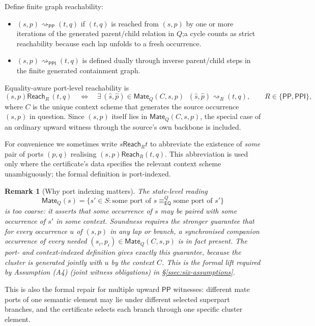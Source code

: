 \documentclass[11pt]{article}
\newtheorem{remark}[theorem]{Remark}
\newcommand{\EQ}{\mathsf{EQ}}
\newcommand{\PP}{\mathsf{PP}}
\newcommand{\PPI}{\mathsf{PPI}}
\newcommand{\Mate}{\mathsf{Mate}}
\newcommand{\reach}{\rightsquigarrow}
\newcommand{\Reach}{\mathrel{\mathsf{Reach}}}
\newcommand{\eqc}{\equiv_{\EQ}}
\begin{document}
Define finite graph reachability:
\begin{itemize}
\item $(s,p)\reach_{\PP}(t,q)$ if $(t,q)$ is reached from $(s,p)$ by
one or more iterations of the generated parent/child relation in
$Q$;\@ a cycle counts as strict reachability because each lap
unfolds to a fresh occurrence.
\item $(s,p)\reach_{\PPI}(t,q)$ is defined dually through inverse
parent/child steps in the finite generated containment graph.
\end{itemize}
Equality-aware port-level reachability is
\[
  (s,p)\Reach_R\,(t,q)
  \quad\Longleftrightarrow\quad
  \exists\,(\widehat s,\widehat p)\in\Mate_Q(C,s,p)\;\;
  (\widehat s,\widehat p)\reach_R(t,q),
  \qquad R\in\{\PP,\PPI\},
\]
where $C$ is the unique context scheme that generates the source
occurrence $(s,p)$ in question.  Since $(s,p)$ itself lies in
$\Mate_Q(C,s,p)$, the special case of an ordinary upward witness
through the source's own backbone is included.

For convenience we sometimes write $s\Reach_R t$ to abbreviate the
existence of \emph{some} pair of ports $(p,q)$ realising
$(s,p)\Reach_R(t,q)$.  This abbreviation is used only where the
certificate's data specifies the relevant context scheme
unambiguously; the formal definition is port-indexed.

\begin{remark}[Why port indexing matters]\label{rem:why-port-indexing}
The state-level reading
\[
  \Mate_Q(s)=\{s'\in S:\text{some port of }s\eqc^{Q}\text{some port of }s'\}
\]
is too coarse: it asserts that \emph{some} occurrence of $s$ may be
paired with \emph{some} occurrence of $s'$ in \emph{some} context.
Soundness requires the stronger guarantee that for every occurrence
$u$ of $(s,p)$ in any lap or branch, a synchronised companion
occurrence of every needed $(s_i,p_i)\in\Mate_Q(C,s,p)$ is in fact
present.  The port- and context-indexed definition gives exactly
this guarantee, because the cluster is generated jointly with $u$
by the context $C$.  This is the formal lift required by Assumption
(A4) (joint witness obligations) in \S\ref{ssec:six-assumptions}.
\end{remark}

This is also the formal repair for multiple upward $\PP$
witnesses: different mate ports of one semantic element may lie
under different selected superpart branches, and the certificate
selects each branch through one specific cluster element.
\end{document}
